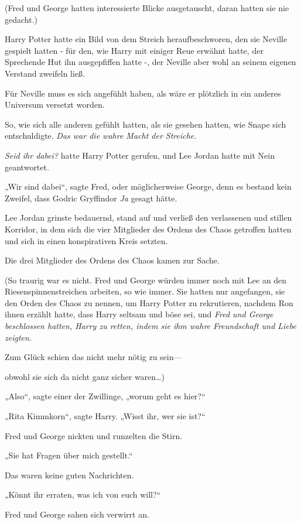{(Fred und George hatten interessierte Blicke ausgetauscht, daran hatten sie nie gedacht.)

Harry Potter hatte ein Bild von dem Streich heraufbeschworen, den sie Neville gespielt hatten - für den, wie Harry mit einiger Reue erwähnt hatte, der Sprechende Hut ihn ausgepfiffen hatte -, der Neville aber wohl an seinem eigenen Verstand zweifeln ließ.

Für Neville muss es sich angefühlt haben, als wäre er plötzlich in ein anderes Universum versetzt worden.

So, wie sich alle anderen gefühlt hatten, als sie gesehen hatten, wie Snape sich entschuldigte. \emph{Das war die wahre Macht der Streiche.}

\emph{Seid ihr dabei?} hatte Harry Potter gerufen, und Lee Jordan hatte mit Nein geantwortet.

„Wir sind dabei“, sagte Fred, oder möglicherweise George, denn es bestand kein Zweifel, dass Godric Gryffindor \emph{Ja} gesagt hätte.

Lee Jordan grinste bedauernd, stand auf und verließ den verlassenen und stillen Korridor, in dem sich die vier Mitglieder des Ordens des Chaos getroffen hatten und sich in einen konspirativen Kreis setzten.

Die drei Mitglieder des Ordens des Chaos kamen zur Sache.

(So traurig war es nicht. Fred und George würden immer noch mit Lee an den Riesenspinnenstreichen arbeiten, so wie immer. Sie hatten nur angefangen, sie den Orden des Chaos zu nennen, um Harry Potter zu rekrutieren, nachdem Ron ihnen erzählt hatte, dass Harry seltsam und böse sei, und \emph{Fred und George beschlossen hatten, Harry zu retten, indem sie ihm wahre Freundschaft und Liebe zeigten.}

Zum Glück schien das nicht mehr nötig zu sein—

obwohl sie sich da nicht ganz sicher waren…)

„Also“, sagte einer der Zwillinge, „worum geht es hier?“

„Rita Kimmkorn“, sagte Harry. „Wisst ihr, wer sie ist?“

Fred und George nickten und runzelten die Stirn.

„Sie hat Fragen über mich gestellt.“

Das waren keine guten Nachrichten.

„Könnt ihr erraten, was ich von euch will?“

Fred und George sahen sich verwirrt an.

}

